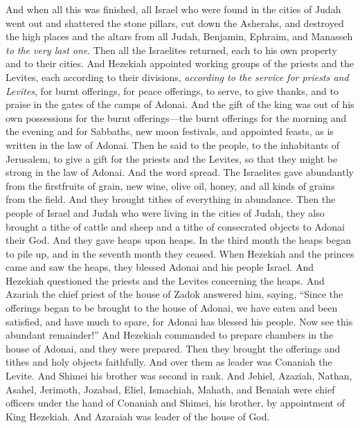 \begin{biblechapter} %
 And when all this was finished, all Israel who were found in the cities of Judah went out and shattered the stone pillars, cut down the Asherahs, and destroyed the high places and the altars from all Judah, Benjamin, Ephraim, and Manasseh \textit{to the very last one}. Then all the Israelites returned, each to his own property and to their cities.
\verse And Hezekiah appointed working groups of the priests and the Levites, each according to their divisions, \textit{according to the service for priests and Levites}, for burnt offerings, for peace offerings, to serve, to give thanks, and to praise in the gates of the camps of Adonai.
\verse And the gift of the king was out of his own possessions for the burnt offerings—the burnt offerings for the morning and the evening and for Sabbaths, new moon festivals, and appointed feasts, as is written in the law of Adonai.
\verse Then he said to the people, to the inhabitants of Jerusalem, to give a gift for the priests and the Levites, so that they might be strong in the law of Adonai.
\verse And the word spread. The Israelites gave abundantly from the firstfruits of grain, new wine, olive oil, honey, and all kinds of grains from the field. And they brought tithes of everything in abundance.
\verse Then the people of Israel and Judah who were living in the cities of Judah, they also brought a tithe of cattle and sheep and a tithe of consecrated objects to Adonai their God. And they gave heaps upon heaps.
\verse In the third month the heaps began to pile up, and in the seventh month they ceased.
\verse When Hezekiah and the princes came and saw the heaps, they blessed Adonai and his people Israel.
\verse And Hezekiah questioned the priests and the Levites concerning the heaps.
\verse And Azariah the chief priest of the house of Zadok answered him, saying, “Since the offerings began to be brought to the house of Adonai, we have eaten and been satisfied, and have much to spare, for Adonai has blessed his people. Now see this abundant remainder!”
\verse And Hezekiah commanded to prepare chambers in the house of Adonai, and they were prepared.
\verse Then they brought the offerings and tithes and holy objects faithfully. And over them as leader was Conaniah the Levite. And Shimei his brother was second in rank.
\verse And Jehiel, Azaziah, Nathan, Asahel, Jerimoth, Jozabad, Eliel, Ismachiah, Mahath, and Benaiah were chief officers under the hand of Conaniah and Shimei, his brother, by appointment of King Hezekiah. And Azaraiah was leader of the house of God.

\end{biblechapter}
